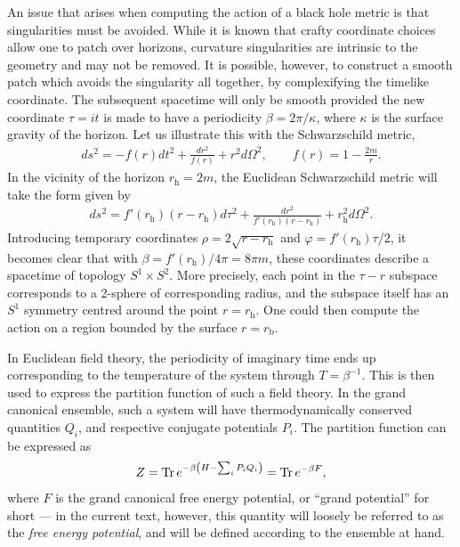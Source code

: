 \documentclass[
twoside,
openright,
frontopenright,
]{dmathesis}
\begin{document}
An issue that arises when computing the action of a black hole metric is that
singularities must be avoided. While it is known that crafty coordinate choices
allow one to patch over horizons, curvature singularities are intrinsic to the
geometry and may not be removed. It is possible, however, to construct a smooth
patch which avoids the singularity all together, by complexifying the timelike
coordinate. The subsequent spacetime will only be smooth provided the new
coordinate $\tau=it$ is made to have a periodicity $\beta = 2\pi/\kappa$, where
$\kappa$ is the surface gravity of the horizon. Let us illustrate this with the
Schwarzschild metric,
\begin{align}
  \label{eq:schwarzschildAF}
  ds^2 = -f(r)dt^2 + \frac{dr^2}{f(r)} + r^2 d\Omega^2, \qquad f(r) = 1-\frac{2m}{r}.
\end{align}
In the vicinity of the horizon $r_\mathrm{h} = 2m$, the Euclidean Schwarzschild
metric will take the form given by
\begin{align}
  \label{eq:schwarzschildAFE}
  ds^2 = f'(r_\mathrm{h})(r-r_\mathrm{h})d\tau^2+
  \frac{dr^2}{f'(r_\mathrm{h})(r-r_\mathrm{h})}+r_\mathrm{h}^2 d\Omega^2.  
\end{align}
Introducing temporary coordinates $\rho = 2\sqrt{r-r_\mathrm{h}}$ and
$\varphi = f'(r_\mathrm{h})\tau/2$, it becomes clear that with
$\beta = f'(r_\mathrm{h})/4\pi = 8\pi m$, these coordinates describe a spacetime
of topology $S^1 \times S^2$. More precisely, each point in the $\tau-r$
subspace corresponds to a 2-sphere of corresponding radius, and the subspace
itself has an $S^1$ symmetry centred around the point $r = r_\mathrm{h}$. One
could then compute the action on a region bounded by the surface
$r = r_\mathrm{b}$.

In Euclidean field theory, the periodicity of imaginary time ends up
corresponding to the temperature of the system through $T=\beta^{-1}$. This is
then used to express the partition function of such a field theory. In the grand
canonical ensemble, such a system will have thermodynamically conserved
quantities $Q_i$, and respective conjugate potentials $P_i$. The partition
function can be expressed as
\begin{align}
  \label{eq:partitionfunction2}
  Z = \operatorname{Tr} e^{-\beta\left(H - \sum_iP_i Q_i\right)} = \operatorname{Tr} e^{-\beta F},
\end{align}
where $F$ is the grand canonical free energy potential, or ``grand potential''
for short --- in the current text, however, this quantity will loosely be
referred to as the \emph{free energy potential}, and will be defined according
to the ensemble at hand.
\end{document}
